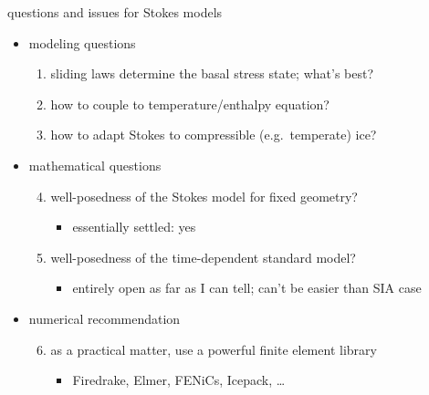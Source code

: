 \documentclass[10pt,dvipsnames]{beamer}
\begin{document}
\begin{frame}{questions and issues for Stokes models}
\begin{itemize}
\item[] \alert{modeling questions}
    \begin{enumerate}
    \item sliding laws determine the basal stress state; what's best?
    \item how to couple to temperature/enthalpy equation?
    \item how to adapt Stokes to compressible (e.g.~temperate) ice?
    \end{enumerate}
\item[] \alert{mathematical questions}
    \begin{enumerate}\setcounter{enumi}{3}
    \item well-posedness of the Stokes model for fixed geometry?
        \begin{itemize}
        \item[$\circ$] essentially settled: yes  \cite{JouvetRappaz2011}
        \end{itemize}
    \item well-posedness of the time-dependent standard model?
        \begin{itemize}
        \item[$\circ$] entirely open as far as I can tell; can't be easier than SIA case
        \end{itemize}
    \end{enumerate}
\item[] \alert{numerical recommendation}
    \begin{enumerate}\setcounter{enumi}{5}
    \item as a practical matter, use a powerful finite element \cite{Elmanetal2014} library
        \begin{itemize}
        \item[$\circ$] Firedrake, Elmer, FENiCs, Icepack, \dots
        \end{itemize}
    \end{enumerate}
\end{itemize}
\end{frame}
\end{document}
